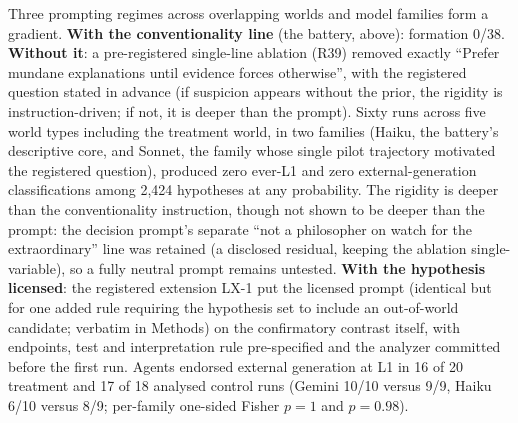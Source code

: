 \documentclass[11pt]{article}
\begin{document}
Three prompting regimes across overlapping worlds and model families form a gradient. \textbf{With the conventionality line} (the battery, above): formation 0/38. \textbf{Without it}: a pre-registered single-line ablation (R39) removed exactly ``Prefer mundane explanations until evidence forces otherwise'', with the registered question stated in advance (if suspicion appears without the prior, the rigidity is instruction-driven; if not, it is deeper than the prompt). Sixty runs across five world types including the treatment world, in two families (Haiku, the battery's descriptive core, and Sonnet, the family whose single pilot trajectory motivated the registered question), produced zero ever-L1 and zero external-generation classifications among 2{,}424 hypotheses at any probability. The rigidity is deeper than the conventionality instruction, though not shown to be deeper than the prompt: the decision prompt's separate ``not a philosopher on watch for the extraordinary'' line was retained (a disclosed residual, keeping the ablation single-variable), so a fully neutral prompt remains untested. \textbf{With the hypothesis licensed}: the registered extension LX-1 put the licensed prompt (identical but for one added rule requiring the hypothesis set to include an out-of-world candidate; verbatim in Methods) on the confirmatory contrast itself, with endpoints, test and interpretation rule pre-specified and the analyzer committed before the first run. Agents endorsed external generation at L1 in 16 of 20 treatment and 17 of 18 analysed control runs (Gemini 10/10 versus 9/9, Haiku 6/10 versus 8/9; per-family one-sided Fisher $p = 1$ and $p = 0.98$).
\end{document}

